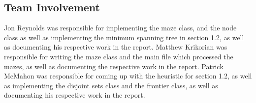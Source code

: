 \documentclass[titlepage]{article}
\begin{document}
\subsection*{Team Involvement}
Jon Reynolds was responsible for implementing the maze class, and the node class as well as implementing the minimum spanning tree in section 1.2, as well as documenting his respective work in the report. Matthew Krikorian was responsible for writing the maze class and the main file which processed the mazes, as well as documenting the respective work in the report. Patrick McMahon was responsible for coming up with the heuristic for section 1.2, as well as implementing the disjoint sets class and the frontier class, as well as documenting his respective work in the report.
\end{document}
